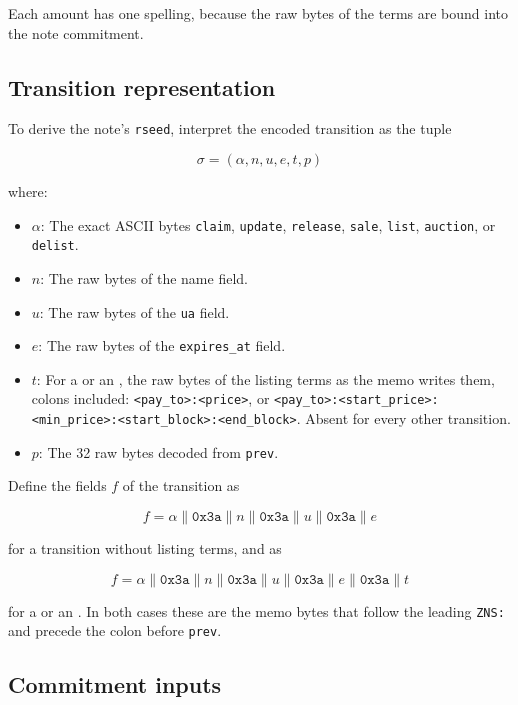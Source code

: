 Each amount has one spelling, because the raw bytes of the terms are bound into the note commitment.

\subsection{Transition representation}

To derive the note's \texttt{rseed}, interpret the encoded transition as the tuple

$$\sigma = (\alpha, n, u, e, t, p)$$

where:
\begin{itemize}
  \item $\alpha$: The exact ASCII bytes \texttt{claim}, \texttt{update}, \texttt{release}, \texttt{sale}, \texttt{list}, \texttt{auction}, or \texttt{delist}.
  \item $n$: The raw bytes of the name field.
  \item $u$: The raw bytes of the \texttt{ua} field.
  \item $e$: The raw bytes of the \texttt{expires\_at} field.
  \item $t$: For a  or an , the raw bytes of the listing terms as the memo writes them, colons included: \texttt{<pay\_to>:<price>}, or \texttt{<pay\_to>:<start\_price>:<min\_price>:<start\_block>:<end\_block>}. Absent for every other transition.
  \item $p$: The 32 raw bytes decoded from \texttt{prev}.
\end{itemize}

Define the fields $f$ of the transition as

$$f = \alpha \parallel \mathtt{0x3a} \parallel n \parallel \mathtt{0x3a} \parallel u \parallel \mathtt{0x3a} \parallel e$$

for a transition without listing terms, and as

$$f = \alpha \parallel \mathtt{0x3a} \parallel n \parallel \mathtt{0x3a} \parallel u \parallel \mathtt{0x3a} \parallel e \parallel \mathtt{0x3a} \parallel t$$

for a  or an . In both cases these are the memo bytes that follow the leading \texttt{ZNS:} and precede the colon before \texttt{prev}.

\subsection{Commitment inputs}

